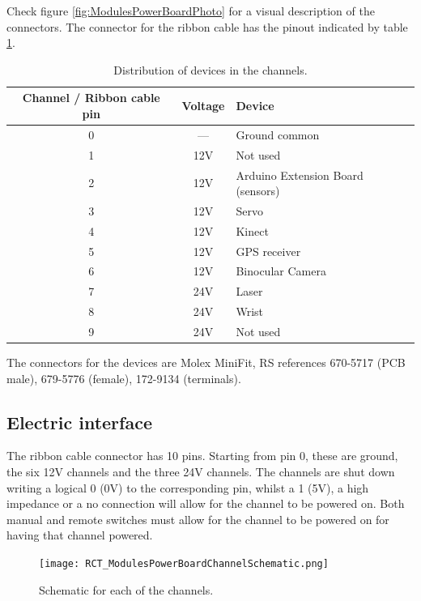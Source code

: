 Check figure \ref{fig:ModulesPowerBoardPhoto} for a visual description of the connectors.
The connector for the ribbon cable has the pinout indicated by table \ref{tab:ModulesArduinoPowerChannels}.
\begin{table}
  \centering
  \begin{tabular}{|c|c|l|} \hline
    \textbf{Channel / Ribbon cable pin} & \textbf{Voltage} & \textbf{Device} \\ \hline \hline
    0  & --- & Ground common \\ \hline
    1  & 12V & Not used \\ \hline
    2  & 12V & Arduino Extension Board (sensors) \\ \hline
    3  & 12V & Servo \\ \hline
    4  & 12V & Kinect \\ \hline
    5  & 12V & GPS receiver \\ \hline
    6  & 12V & Binocular Camera \\ \hline
    7  & 24V & Laser \\ \hline
    8  & 24V & Wrist \\ \hline
    9  & 24V & Not used \\ \hline
  \end{tabular}
  \caption{Distribution of devices in the channels.}
  \label{tab:ModulesArduinoPowerChannels}
\end{table}

The connectors for the devices are Molex MiniFit, RS references 670-5717 (PCB male), 679-5776
(female), 172-9134 (terminals).




\subsection{Electric interface}
The ribbon cable connector has 10 pins. Starting from pin 0, these are ground, the six
12V channels and the three 24V channels.
The channels are shut down writing a logical 0 (0V) to the corresponding pin, whilst
a 1 (5V), a high impedance or a no connection will allow for the channel to be
powered on. Both manual and remote switches must allow for the channel to be
powered on for having that channel powered.

\begin{figure}[htbp]
\begin{center}
 {\texttt{[image: RCT\_ModulesPowerBoardChannelSchematic.png]}}
\end{center}
\caption{Schematic for each of the channels.}
\label{fig:ModulesPowerBoardChannelSchematic}
\end{figure}

